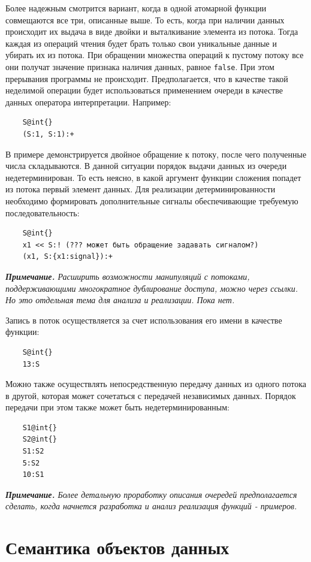 Более надежным смотрится вариант, когда в одной атомарной функции совмещаются все три, описанные выше. То есть, когда при наличии данных происходит их выдача в виде двойки и выталкивание элемента из потока. Тогда каждая из операций чтения будет брать только свои уникальные данные и убирать их из потока. При обращении множества операций к пустому потоку все они получат значение признака наличия данных, равное \verb|false|. При этом прерывания программы не происходит. Предполагается, что в качестве такой неделимой операции будет использоваться применением очереди в качестве данных оператора интерпретации. Например:
\begin{verbatim}
    S@int{}
    (S:1, S:1):+
\end{verbatim}

В примере демонстрируется двойное обращение к потоку, после чего полученные числа складываются. В данной ситуации порядок выдачи данных из очереди недетерминирован. То есть неясно, в какой аргумент функции сложения попадет из потока первый элемент данных. Для реализации детерминированности необходимо формировать дополнительные сигналы обеспечивающие требуемую последовательность:
\begin{verbatim}
    S@int{}
    x1 << S:! (??? может быть обращение задавать сигналом?)
    (x1, S:{x1:signal}):+
\end{verbatim}


\textit{\textbf{Примечание.}
Расширить возможности манипуляций с потоками, поддерживающими многократное дублирование доступа, можно через ссылки. Но это отдельная тема для анализа и реализации. Пока нет.}

Запись в поток осуществляется за счет использования его имени в качестве функции:
\begin{verbatim}
    S@int{}
    13:S
\end{verbatim}

Можно также осуществлять непосредственную передачу данных из одного потока в другой, которая может сочетаться с передачей независимых данных. Порядок передачи при этом также может быть недетерминированным:
\begin{verbatim}
    S1@int{}
    S2@int{}
    S1:S2
    5:S2
    10:S1
\end{verbatim}


\textit{\textbf{Примечание.}
Более детальную проработку описания очередей предполагается сделать, когда начнется разработка и анализ реализация функций - примеров.}

\section{Семантика объектов данных}

